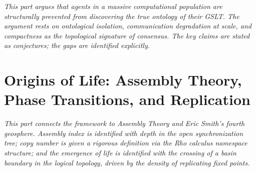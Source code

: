 \documentclass[12pt,openright,twoside]{book}
\theoremstyle{remark}
\begin{document}
\vspace{1em}
\begin{mdframed}[backgroundcolor=remarkgray, linecolor=gray!60,
                 linewidth=1pt, topline=false, rightline=false,
                 bottomline=false]
\small\itshape
This part argues that agents in a massive computational population
are structurally prevented from discovering the true ontology of
their GSLT.
The argument rests on ontological isolation, communication
degradation at scale, and compactness as the topological signature
of consensus.
The key claims are stated as conjectures; the gaps are identified
explicitly.
\end{mdframed}

\bigskip


\part{Origins of Life: Assembly Theory, Phase Transitions, and Replication}

\vspace{1em}
\begin{mdframed}[backgroundcolor=remarkgray, linecolor=gray!60,
                 linewidth=1pt, topline=false, rightline=false,
                 bottomline=false]
\small\itshape
This part connects the framework to Assembly Theory and Eric
Smith's fourth geosphere.
Assembly index is identified with depth in the open synchronization
tree; copy number is given a rigorous definition via the Rho calculus
namespace structure; and the emergence of life is identified with
the crossing of a basin boundary in the logical topology, driven
by the density of replicating fixed points.
\end{mdframed}
\end{document}
